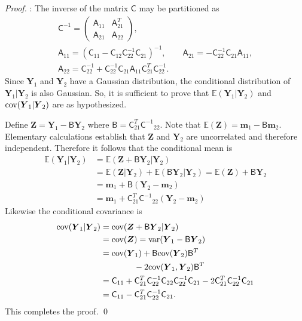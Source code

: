 \documentclass[twocolumn]{svjour3}          %
\newcommand{\bm}[1]{\boldsymbol{#1}}
\newcommand{\mB}{\mathsf{B}}
\newcommand{\Ex}{\mathbb{E}}
\newcommand{\vm}{\bm{m}}
\newcommand{\vY}{\bm{Y}}
\newcommand{\vZ}{\bm{Z}}
\newcommand{\mA}{\mathsf{A}}
\newcommand{\mC}{\mathsf{C}}
\newcommand{\mCInv}{{\mathsf{C}^{-1}}}
\newcommand{\cov}{{\textup{cov}}}
\newcommand{\var}{{\textup{var}}}
\begin{document}
\begin{proof}:
The inverse of the matrix $\mC$ may be partitioned as \cite{???}
	\begin{gather*}
	\mC^{-1} = \begin{pmatrix} \mA_{11} & \mA_{21}^T \\ \mA_{21} & \mA_{22} \end{pmatrix}, \\
	\mA_{11} = (\mC_{11} - \mC_{12} \mC_{22}^{-1} \mC_{21})^{-1}, \qquad 
	\mA_{21} = -  \mC_{22}^{-1} \mC_{21} \mA_{11}, \\ 
	\mA_{22} = \mC_{22}^{-1} + \mC_{22}^{-1} \mC_{21} \mA_{11} \mC_{21}^T \mC_{22}^{-1}.
	\end{gather*}
Since $\vY_1$ and $\vY_2$ have a Gaussian distribution, the conditional distribution of $\vY_1 \vert \vY_2$ is also Gaussian. So, it is sufficient to prove that $\Ex(\vY_1 \vert \vY_2)$ and $\cov(\vY_1 \vert \vY_2)$ are as hypothesized.

Define $\vZ=\vY_1- \mB \vY_2$ where $\mB=\mC_{21}^T \mCInv_{22}$. Note that $\Ex(\vZ) = \vm_1 - \mB \vm_2$.  Elementary calculations establish that $\vZ$ and $\vY_2$ are uncorrelated and therefore independent.   Therefore it follows that the conditional mean is
\begin{align*}
\Ex(\vY_1 \vert \vY_2) &= \Ex(\vZ + \mB \vY_2 \vert \vY_2) 
\\ & = \Ex(\vZ \vert \vY_2) + \Ex(\mB \vY_2 \vert \vY_2) 
= \Ex(\vZ) + \mB\vY_2 
\\
& = \vm_1 + \mB (\vY_2 - \vm_2) \\
& =  \vm_1+ \mC_{21}^T \mCInv_{22}(\vY_2 - \vm_2)
\end{align*}
Likewise the conditional covariance is 
\begin{align*}
\cov(\vY_1|\vY_2) &=\cov(\vZ + \mB \vY_2|\vY_2) \\
& =\cov(\vZ) = \var(\vY_1 - \mB \vY_2)
\\
 & =\cov(\vY_1)+\mB\cov(\vY_2)\mB^T \\
 & \qquad  \qquad  - 2  \cov(\vY_1,\vY_2) \mB^T
\\
&=\mC_{11}+\mC_{21}^T\mC_{22}^{-1}\mC_{22}\mC_{22}^{-1}\mC_{21}-2\mC_{21}^T\mC_{22}^{-1}\mC_{21}
\\
&=\mC_{11}-\mC_{21}^T\mC_{22}^{-1}\mC_{21}.
\end{align*}
This completes the proof. \qed
\end{proof}


\fi
\end{document}
